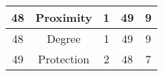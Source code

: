 \documentclass[results.tex]{subfiles}
\begin{document}
\begin{center}
\begin{tabular}{| c || c | c | c | c |}
            \hline
            48                      & Proximity                    & 1                      & 49                      & 9                    \\
            \hline
            48                      & Degree                       & 1                      & 49                      & 9                    \\
            \hline
            49                      & Protection                   & 2                      & 48                      & 7                    \\
            \hline
        \end{tabular}
    \end{center}
\end{document}
